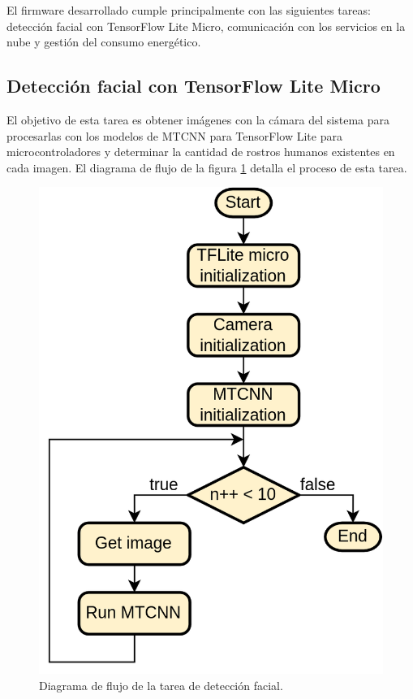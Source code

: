 El firmware desarrollado cumple principalmente con las siguientes tareas: detección facial con TensorFlow Lite Micro, comunicación con los servicios en la nube y gestión del consumo energético.

\subsection{Detección facial con TensorFlow Lite Micro}
El objetivo de esta tarea es obtener imágenes con la cámara del sistema para procesarlas con los modelos de MTCNN para TensorFlow Lite para microcontroladores y determinar la cantidad de rostros humanos existentes en cada imagen. El diagrama de flujo de la figura \ref{fig:fw_detect_flow} detalla el proceso de esta tarea.

\newpage

\begin{figure}[h]
	\centering
	\includegraphics[scale=0.22]{./Figures/fw_detection_flow.png}
	\caption{Diagrama de flujo de la tarea de detección facial.}
	\label{fig:fw_detect_flow}
\end{figure}

